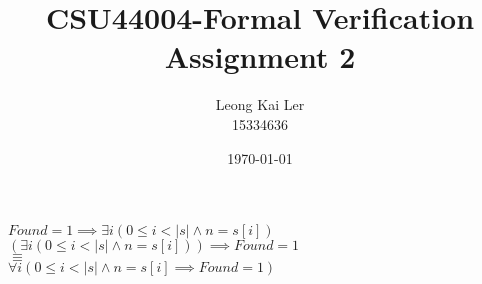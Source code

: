 \documentclass[12pt]{article}
\makeatletter
\newcommand\abs[1]{\left|#1\right|}
\renewcommand{\maketitle}{\bgroup\setlength{\parindent}{0pt}
\begin{flushleft}
  \textbf{\@title}

  \@author
  \@date
\end{flushleft}\egroup
}
\makeatother
\begin{document}
\title{CSU44004-Formal Verification Assignment 2 }
\author{Leong Kai Ler \\ 15334636 \\   }
\date{\today}
\maketitle

\noindent $Found = 1 \implies \exists i (0 \leq i < \abs{s} \land n = s[i])$ \\
$(\exists i (0 \leq i < \abs{s} \land n = s[i])) \implies Found = 1$ \\
$\equiv$ \\
$\forall i(0 \leq i < \abs{s} \land n = s[i] \implies Found = 1)$ \\ \\
\end{document}
